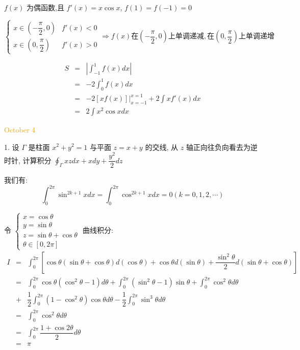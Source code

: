 \begin{solution}

	$f(x)$ 为偶函数,且 $f'(x)=x\cos x$, $f(1)=f(-1)=0$  

	$$\begin{cases}
		x\in(-\dfrac{\pi}{2},0) & f'(x)<0\\
		x\in(0,\dfrac{\pi}{2}) & f'(x)>0
	\end{cases}\Rightarrow
	 f(x) \text{在}(-\dfrac{\pi}{2},0)\text{上单调递减},
	 \text{在}(0,\dfrac{\pi}{2})\text{上单调递增}$$
	
	\begin{eqnarray*}
		S & = & |\int_{-1}^{1}f(x)dx|\\
		  & = & -2\int_{0}^{1}f(x)dx\\
		  & = & -2[xf(x)]\big|_{x=-1}^{x=1} + 2\int xf'(x)dx\\
		  & = & 2\int x^{2}\cos xdx
	\end{eqnarray*}
\end{solution}


\textcolor{orange}{October 4}

1. 设 $\varGamma$ 是柱面 $x^{2}+y^{2}=1$ 与平面 $z=x+y$ 的交线,
从 $z$ 轴正向往负向看去为逆时针, 计算积分 $\displaystyle{\oint_{\varGamma}xzdx+xdy+\dfrac{y^2}{2}dz}$

\begin{solution}

	我们有:
	$$\int_{0}^{2\pi}\sin^{2k+1}xdx = \int_{0}^{2\pi}\cos^{2k+1}xdx = 0(k=0,1,2,\cdots)$$
	
	令 $\begin{cases}
		x = \cos \theta \\
		y = \sin \theta \\
		z = \sin \theta + \cos \theta \\
		\theta \in [0,2\pi]
	\end{cases}$  曲线积分:
	\begin{eqnarray*}
		  I & = & \int_{0}^{2\pi}\left[ \cos\theta(\sin\theta+\cos\theta)d(\cos\theta)
		   	      + \cos\theta d(\sin\theta) + \dfrac{\sin^{2}\theta}{2}d(\sin\theta+\cos\theta)\right]\\
			& = & \int_{0}^{2\pi}\cos\theta(\cos^{2}\theta-1)d\theta + \int_{0}^{2\pi}(\sin^{2}\theta-1)\sin\theta
				  + \int_{0}^{2\pi}\cos^{2}\theta d\theta \\
			& + & \dfrac{1}{2}\int_{0}^{2\pi}(1-\cos^{2}\theta)\cos\theta d\theta - \dfrac{1}{2}\int_{0}^{2\pi}\sin^{3}\theta d\theta\\
			& = & \int_{0}^{2\pi}\cos^{2}\theta d\theta\\
			& = & \int_{0}^{2\pi}\dfrac{1+\cos2\theta}{2}d\theta\\
			& = & \pi
	\end{eqnarray*}
\end{solution}


